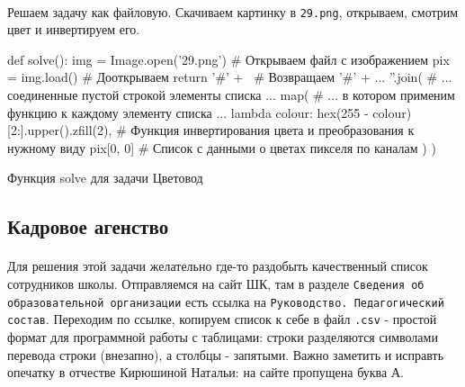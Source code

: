\documentclass[12pt]{article}
\begin{document}
    \paragraph{}
    Решаем задачу как файловую.
    Скачиваем картинку в \verb|29.png|, открываем, смотрим цвет и инвертируем его.
    \begin{listing}[H]
        \begin{pythoncode}
def solve():
    img = Image.open('29.png')   # Открываем файл с изображением
    pix = img.load()             # Дооткрываем
    return '#' + \               # Возвращаем '#' + ...
           ''.join(              # ... соединенные пустой строкой элементы списка ...
               map(              # ... в котором применим функцию к каждому элементу списка ...
                   lambda colour: hex(255 - colour)[2:].upper().zfill(2),
                                 # Функция инвертирования цвета и преобразования к нужному виду
                   pix[0, 0]     # Список с данными о цветах пикселя по каналам
               )
           )
        \end{pythoncode}
        \label{lst:solve29}
        \caption{Функция solve для задачи Цветовод}
    \end{listing}

    \subsection{Кадровое агенство}
    \paragraph{}
    Для решения этой задачи желательно где-то раздобыть качественный список сотрудников школы.
    Отправляемся на сайт ШК, там в разделе \verb|Сведения об образовательной организации| есть ссылка на \verb|Руководство. Педагогический состав|.
    Переходим по ссылке, копируем список к себе в файл \verb|.csv| - простой формат для программной работы с таблицами:
    строки разделяются символами перевода строки (внезапно), а столбцы - запятыми.
    Важно заметить и исправть опечатку в отчестве Кирюшиной Натальи: на сайте пропущена буква А.
    \paragraph{}
\end{document}
